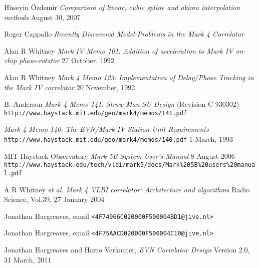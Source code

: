 \documentclass[a4paper]{article}
\begin{document}
\begin{thebibliography}{80}
 Hüseyin Özdemir \emph{Comparison of linear, cubic spline and akima interpolation methods} August 30, 2007

 Roger Cappallo
\emph{Recently Discovered Model Problems in the Mark 4 Correlator}

 Alan R Whitney
\emph{Mark IV Memo 101: Addition of acceleration to Mark IV on-chip phase-rotator}
27 October, 1992

 Alan R Whitney 
\emph{Mark 4 Memo 123: Implementation of Delay/Phase Tracking in the Mark IV correlator}
20 November, 1992.

B. Anderson
\emph{Mark 4 Memo 141: Straw Man SU Design}
(Revision C 930302)
\texttt{http://www.haystack.mit.edu/geo/mark4/memos/141.pdf}

\emph{Mark 4 Memo 140: The EVN/Mark IV Station Unit Requirements}
  \texttt{http://www.haystack.mit.edu/geo/mark4/memos/140.pdf}
1 March, 1993  

MIT Haystack Observatory 
\emph{Mark 5B System User’s Manual}
8 August 2006 
\texttt{http://www.haystack.edu/tech/vlbi/mark5/docs/Mark\%205B\%20users\%20manual.pdf}

A R Whitney \emph{et al.} \emph{Mark 4 VLBI correlator: Architecture and algorithms}
Radio Science, Vol.39,
27 January 2004

Jonathan Hargreaves, email \texttt{<4F74966C020000F500004BD1@jive.nl>}

Jonathan Hargreaves, email \texttt{<4F75AACD020000F500004C10@jive.nl>}

Jonathan Hargreaves and Harro Verkouter, \emph{EVN Correlator Design} Version 2.0, 31 March, 2011

\end{thebibliography}
\end{document}
